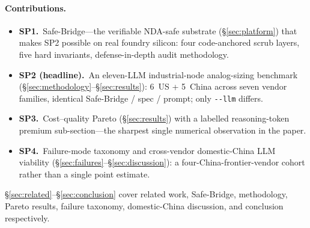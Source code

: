 \paragraph{Contributions.}
\begin{itemize}
  \item \textbf{SP1.}~Safe-Bridge---the verifiable NDA-safe
    substrate (\S\ref{sec:platform}) that makes SP2 possible on
    real foundry silicon: four code-anchored scrub layers, five
    hard invariants, defense-in-depth audit methodology.
  \item \textbf{SP2 (headline).}~An eleven-LLM industrial-node
    analog-sizing benchmark (\S\ref{sec:methodology}--\S\ref{sec:results}):
    6~US + 5~China across seven vendor families, identical
    Safe-Bridge / spec / prompt; only \texttt{-{}-llm} differs.
  \item \textbf{SP3.}~Cost--quality Pareto
    (\S\ref{sec:results}) with a labelled reasoning-token premium
    sub-section---the sharpest single numerical observation in the
    paper.
  \item \textbf{SP4.}~Failure-mode taxonomy and cross-vendor
    domestic-China LLM viability
    (\S\ref{sec:failures}--\S\ref{sec:discussion}): a
    four-China-frontier-vendor cohort rather than a single point
    estimate.
\end{itemize}

\S\ref{sec:related}--\S\ref{sec:conclusion} cover related work,
Safe-Bridge, methodology, Pareto results, failure taxonomy,
domestic-China discussion, and conclusion respectively.
